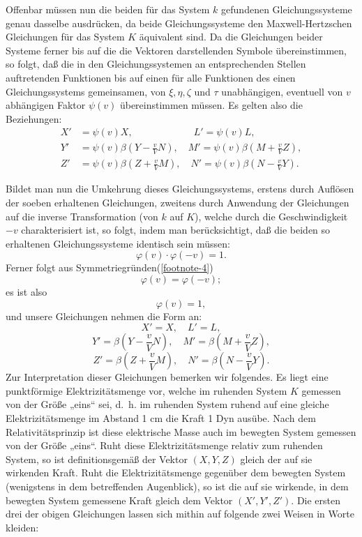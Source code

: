 \documentclass[17pt]{webarticle}       %
\begin{document}
Offenbar müssen nun die beiden für das System \( k \) gefundenen Gleichungssysteme genau dasselbe ausdrücken, da beide Gleichungssysteme den Maxwell-Hertzschen Gleichungen für das System \( K \) äquivalent sind. Da die Gleichungen beider Systeme ferner bis auf die die Vektoren darstellenden Symbole übereinstimmen, so folgt, daß die in den Gleichungssystemen an entsprechenden Stellen auftretenden Funktionen bis auf einen für alle Funktionen des einen Gleichungssystems gemeinsamen, von \(\xi, \eta, \zeta\) und \(\tau\) unabhängigen, eventuell von \( v \) abhängigen Faktor \(\psi(v)\) übereinstimmen müssen. Es gelten also die Beziehungen:
\[
\begin{align*} 
X' &= \psi(v) X, \qquad \qquad \qquad \ L' = \psi(v) L,
\\
Y' &= \psi(v) \beta \left( Y - \frac{v}{V} N \right), \quad M' = \psi(v) \beta \left( M + \frac{v}{V} Z \right),
\\
Z' &= \psi(v) \beta \left( Z + \frac{v}{V} M \right), \quad N' = \psi(v) \beta \left( N - \frac{v}{V} Y \right).
\end{align*}
\]

Bildet man nun die Umkehrung dieses Gleichungssystems, erstens durch Auflösen der soeben erhaltenen Gleichungen, zweitens durch Anwendung der Gleichungen auf die inverse Transformation (von \( k \) auf \( K \)), welche durch die Geschwindigkeit \( -v \) charakterisiert ist, so folgt, indem man berücksichtigt, daß die beiden so erhaltenen Gleichungssysteme identisch sein müssen:
\[
\varphi(v) \cdot \varphi(-v) = 1.
\]
Ferner folgt aus Symmetriegründen(\ref{footnote-4})
\[
\varphi(v) = \varphi(-v);
\]
es ist also
\[
\varphi(v) = 1,
\]
und unsere Gleichungen nehmen die Form an:
\[
X' = X, \quad L' = L,
\]
\[
Y' = \beta \left( Y - \frac{v}{V} N \right), \quad M' = \beta \left( M + \frac{v}{V} Z \right),
\]
\[
Z' = \beta \left( Z + \frac{v}{V} M \right), \quad N' = \beta \left( N - \frac{v}{V} Y \right).
\]
Zur Interpretation dieser Gleichungen bemerken wir folgendes. Es liegt eine punktförmige Elektrizitätsmenge vor, welche im ruhenden System \( K \) gemessen von der Größe „eins“ sei, d.~h. im ruhenden System ruhend auf eine gleiche Elektrizitätsmenge im Abstand 1 cm die Kraft 1 Dyn ausübe. Nach dem Relativitätsprinzip ist diese elektrische Masse auch im bewegten System gemessen von der Größe „eins“. Ruht diese Elektrizitätsmenge relativ zum ruhenden System, so ist definitionsgemäß der Vektor \( (X, Y, Z) \) gleich der auf sie wirkenden Kraft. Ruht die Elektrizitätsmenge gegenüber dem bewegten System (wenigstens in dem betreffenden Augenblick), so ist die auf sie wirkende, in dem bewegten System gemessene Kraft gleich dem Vektor \( (X', Y', Z') \). Die ersten drei der obigen Gleichungen lassen sich mithin auf folgende zwei Weisen in Worte kleiden:
\end{document}
